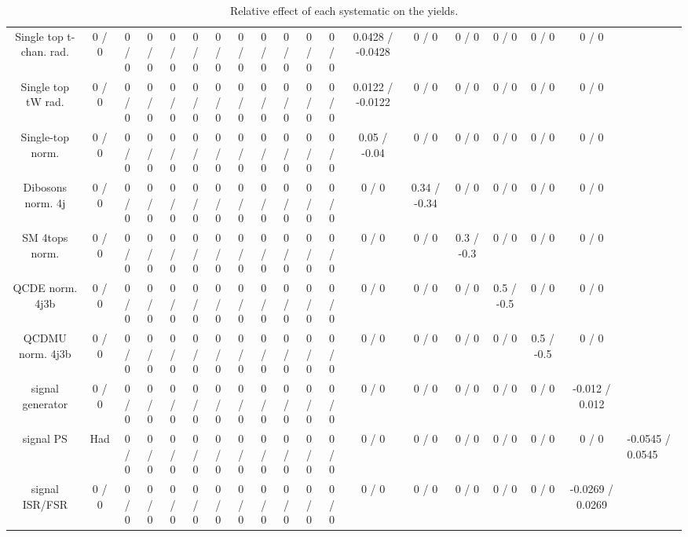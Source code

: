\documentclass[10pt]{article}
\begin{document}
\begin{table}[htbp]
\begin{center}
\begin{tabular}{|c|c|c|c|c|c|c|c|c|c|c|c|c|c|c|c|c|c|}
  Single top t-chan. rad. & 0 / 0 & 0 / 0 & 0 / 0 & 0 / 0 & 0 / 0 & 0 / 0 & 0 / 0 & 0 / 0 & 0 / 0 & 0 / 0 & 0 / 0 & 0.0428 / -0.0428 & 0 / 0 & 0 / 0 & 0 / 0 & 0 / 0 & 0 / 0 \\ 
  Single top tW rad. & 0 / 0 & 0 / 0 & 0 / 0 & 0 / 0 & 0 / 0 & 0 / 0 & 0 / 0 & 0 / 0 & 0 / 0 & 0 / 0 & 0 / 0 & 0.0122 / -0.0122 & 0 / 0 & 0 / 0 & 0 / 0 & 0 / 0 & 0 / 0 \\ 
  Single-top norm. & 0 / 0 & 0 / 0 & 0 / 0 & 0 / 0 & 0 / 0 & 0 / 0 & 0 / 0 & 0 / 0 & 0 / 0 & 0 / 0 & 0 / 0 & 0.05 / -0.04 & 0 / 0 & 0 / 0 & 0 / 0 & 0 / 0 & 0 / 0 \\ 
  Dibosons norm. 4j & 0 / 0 & 0 / 0 & 0 / 0 & 0 / 0 & 0 / 0 & 0 / 0 & 0 / 0 & 0 / 0 & 0 / 0 & 0 / 0 & 0 / 0 & 0 / 0 & 0.34 / -0.34 & 0 / 0 & 0 / 0 & 0 / 0 & 0 / 0 \\ 
  SM 4tops norm. & 0 / 0 & 0 / 0 & 0 / 0 & 0 / 0 & 0 / 0 & 0 / 0 & 0 / 0 & 0 / 0 & 0 / 0 & 0 / 0 & 0 / 0 & 0 / 0 & 0 / 0 & 0.3 / -0.3 & 0 / 0 & 0 / 0 & 0 / 0 \\ 
  QCDE norm. 4j3b & 0 / 0 & 0 / 0 & 0 / 0 & 0 / 0 & 0 / 0 & 0 / 0 & 0 / 0 & 0 / 0 & 0 / 0 & 0 / 0 & 0 / 0 & 0 / 0 & 0 / 0 & 0 / 0 & 0.5 / -0.5 & 0 / 0 & 0 / 0 \\ 
  QCDMU norm. 4j3b & 0 / 0 & 0 / 0 & 0 / 0 & 0 / 0 & 0 / 0 & 0 / 0 & 0 / 0 & 0 / 0 & 0 / 0 & 0 / 0 & 0 / 0 & 0 / 0 & 0 / 0 & 0 / 0 & 0 / 0 & 0.5 / -0.5 & 0 / 0 \\ 
  signal generator & 0 / 0 & 0 / 0 & 0 / 0 & 0 / 0 & 0 / 0 & 0 / 0 & 0 / 0 & 0 / 0 & 0 / 0 & 0 / 0 & 0 / 0 & 0 / 0 & 0 / 0 & 0 / 0 & 0 / 0 & 0 / 0 & -0.012 / 0.012 \\ 
  signal PS & Had & 0 / 0 & 0 / 0 & 0 / 0 & 0 / 0 & 0 / 0 & 0 / 0 & 0 / 0 & 0 / 0 & 0 / 0 & 0 / 0 & 0 / 0 & 0 / 0 & 0 / 0 & 0 / 0 & 0 / 0 & 0 / 0 & -0.0545 / 0.0545 \\ 
  signal ISR/FSR & 0 / 0 & 0 / 0 & 0 / 0 & 0 / 0 & 0 / 0 & 0 / 0 & 0 / 0 & 0 / 0 & 0 / 0 & 0 / 0 & 0 / 0 & 0 / 0 & 0 / 0 & 0 / 0 & 0 / 0 & 0 / 0 & -0.0269 / 0.0269 \\ 
\hline 
\end{tabular} 
\caption{Relative effect of each systematic on the yields.} 
\end{center} 
\end{table} 
\end{document}
